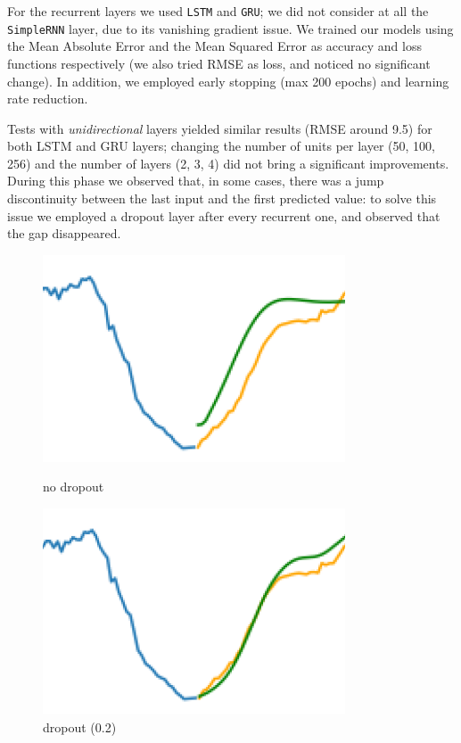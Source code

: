 \documentclass[10.5pt,a4paper,twocolumn]{article}
\begin{document}
For the recurrent layers we used \texttt{LSTM} and \texttt{GRU};
we did not consider at all the \texttt{SimpleRNN} layer, due to its vanishing gradient issue.
We trained our models using the Mean Absolute Error and the Mean Squared Error as accuracy and loss 
functions respectively (we also tried RMSE as loss, and noticed no significant change).
In addition, we employed early stopping (max 200 epochs) and learning rate reduction.

Tests with \textit{unidirectional} layers yielded similar results (RMSE around 9.5) for both LSTM and GRU layers;
changing the number of units per layer (50, 100, 256) and the number of layers (2, 3, 4) did not 
bring a significant improvements. During this phase we observed that, in some cases, there was
a jump discontinuity between the last input and the first predicted value: to solve this issue
we employed a dropout layer after every recurrent one, and observed that the gap disappeared.

\begin{figure}[h]
    \centering
    \begin{minipage}[b]{0.45\linewidth}
        \centering
        \includegraphics[width=0.8\textwidth]{pics/nodropout.png} %
        \caption{no dropout}
    \end{minipage}\hfill
    \begin{minipage}[b]{0.45\linewidth}
        \centering
        \includegraphics[width=0.8\textwidth]{pics/withdropout.png} %
        \caption{dropout (0.2)}
    \end{minipage}
\end{figure}
\newpage
\end{document}
